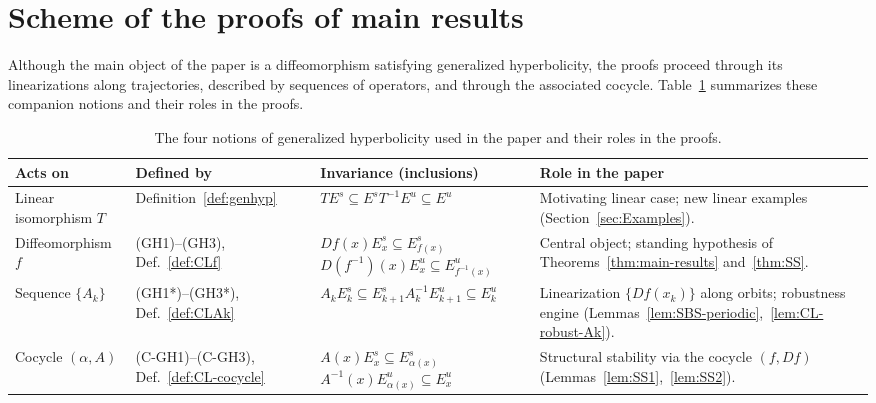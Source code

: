 \documentclass[12pt]{article}
\theoremstyle{definition}
\begin{document}


\section{Scheme of the proofs of main results}\label{sec:scheme}

Although the main object of the paper is a diffeomorphism satisfying generalized hyperbolicity, the proofs proceed through its linearizations along trajectories, described by sequences of operators, and through the associated cocycle.
Table~\ref{tab:notions} summarizes these companion notions and their roles in the proofs.

\begin{table}[!ht]
\small
\renewcommand{\arraystretch}{1.25}
\begin{tabularx}{\textwidth}{@{}l p{2.6cm} >{\raggedright\arraybackslash}X >{\raggedright\arraybackslash}X@{}}
\toprule
\textbf{Acts on} & \textbf{Defined by} & \textbf{Invariance (inclusions)} & \textbf{Role in the paper} \\
\midrule
Linear isomorphism $T$ &
Definition~\ref{def:genhyp} &
$TE^s\subseteq E^s$\newline $T^{-1}E^u\subseteq E^u$ &
Motivating linear case; new linear examples (Section~\ref{sec:Examples}). \\

Diffeomorphism $f$ &
(GH1)--(GH3), Def.~\ref{def:CLf} &
$Df(x)E^s_x\subseteq E^s_{f(x)}$\newline $D(f^{-1})(x)E^u_x\subseteq E^u_{f^{-1}(x)}$ &
Central object; standing hypothesis of Theorems~\ref{thm:main-results} and~\ref{thm:SS}. \\

Sequence $\{A_k\}$ &
(GH1*)--(GH3*), Def.~\ref{def:CLAk}  &
$A_kE^s_k\subseteq E^s_{k+1}$\newline $A_k^{-1}E^u_{k+1}\subseteq E^u_k$ &
Linearization $\{Df(x_k)\}$ along orbits; robustness engine (Lemmas~\ref{lem:SBS-periodic},~\ref{lem:CL-robust-Ak}). \\

Cocycle $(\alpha,A)$ &
(C-GH1)--(C-GH3), Def.~\ref{def:CL-cocycle} &
$A(x)E^s_x\subseteq E^s_{\alpha(x)}$\newline $A^{-1}(x)E^u_{\alpha(x)}\subseteq E^u_x$ &
Structural stability via the cocycle $(f,Df)$ (Lemmas~\ref{lem:SS1},~\ref{lem:SS2}). \\
\bottomrule
\end{tabularx}
\caption{The four notions of generalized hyperbolicity used in the paper and their roles in the proofs.}
\label{tab:notions}
\end{table}
\end{document}
